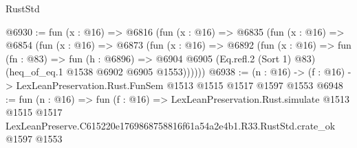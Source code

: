 \begin{lexlean}{RustStd}
\begin{coremodule}
@6930 := fun (x : @16) =>
  @6816
    (fun (x : @16) =>
    @6835
      (fun (x : @16) =>
      @6854
        (fun (x : @16) =>
        @6873
          (fun (x : @16) =>
          @6892
            (fun (x : @16) =>
            fun (fn : @83) =>
            fun (h : @6896) =>
            @6904 @6905 (Eq.refl.{2} (Sort 1) @83) (heq_of_eq.{1} @1538 @6902 @6905 @1553))))))
@6938 := (n : @16) -> (f : @16) -> LexLeanPreservation.Rust.FunSem @1513 @1515 @1517 @1597 @1553
@6948 := fun (n : @16) =>
  fun (f : @16) =>
  LexLeanPreservation.Rust.simulate
    @1513
    @1515
    @1517
    LexLeanPreserve.C615220e1769868758816f61a54a2e4b1.R33.RustStd.crate_ok
    @1597
    @1553
\end{coremodule}
\end{lexlean}
